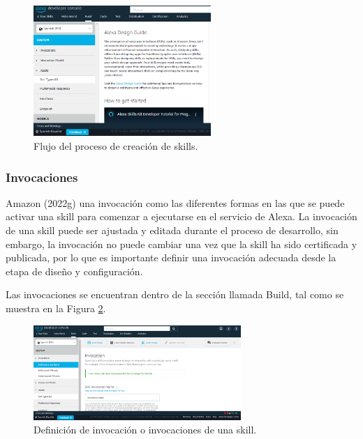\begin{figure}[H]
  \centering
  \includegraphics[width=0.60\textwidth]{Cap4/Figuras/Proceso de creacion de skill.png}
  \caption{Flujo del proceso de creación de skills.}
  \label{fig:44}
\end{figure}


\subsubsection{Invocaciones}
\label{InvocacionescapIV}

Amazon (2022g) una invocación como las diferentes formas en las que se puede activar una skill para comenzar a ejecutarse en el servicio de Alexa. La invocación de una skill puede ser ajustada y editada durante el proceso de desarrollo, sin embargo, la invocación no puede cambiar una vez que la skill ha sido certificada y publicada, por lo que es importante definir una invocación adecuada desde la etapa de diseño y configuración.

Las invocaciones se encuentran dentro de la sección llamada Build, tal como se muestra en la Figura \ref{fig:45}.

\begin{figure}[H]
  \centering
  \includegraphics[width=0.70\textwidth]{Cap4/Figuras/Invocaciones.png}
  \caption{Definición de invocación o invocaciones de una skill.}
  \label{fig:45}
\end{figure}

